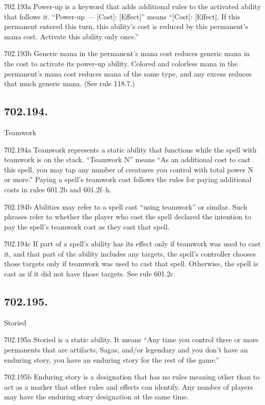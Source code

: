 702.193a Power-up is a keyword that adds additional rules to the activated ability that follows it. “Power-up — [Cost]: [Effect]” means “[Cost]: [Effect]. If this permanent entered this turn, this ability’s cost is reduced by this permanent’s mana cost. Activate this ability only once.”

702.193b Generic mana in the permanent’s mana cost reduces generic mana in the cost to activate its power-up ability. Colored and colorless mana in the permanent’s mana cost reduces mana of the same type, and any excess reduces that much generic mana. (See rule 118.7.)

\subsection*{702.194.}
Teamwork

702.194a Teamwork represents a static ability that functions while the spell with teamwork is on the stack. “Teamwork N” means “As an additional cost to cast this spell, you may tap any number of creatures you control with total power N or more.” Paying a spell’s teamwork cost follows the rules for paying additional costs in rules 601.2b and 601.2f–h.

702.194b Abilities may refer to a spell cast “using teamwork” or similar. Such phrases refer to whether the player who cast the spell declared the intention to pay the spell’s teamwork cost as they cast that spell.

702.194c If part of a spell’s ability has its effect only if teamwork was used to cast it, and that part of the ability includes any targets, the spell’s controller chooses those targets only if teamwork was used to cast that spell. Otherwise, the spell is cast as if it did not have those targets. See rule 601.2c.

\subsection*{702.195.}
Storied

702.195a Storied is a static ability. It means “Any time you control three or more permanents that are artifacts, Sagas, and/or legendary and you don’t have an enduring story, you have an enduring story for the rest of the game.”

702.195b Enduring story is a designation that has no rules meaning other than to act as a marker that other rules and effects can identify. Any number of players may have the enduring story designation at the same time.

